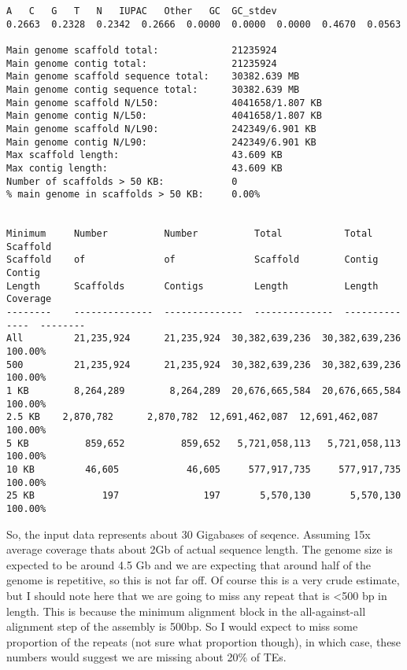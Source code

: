 \documentclass[11pt]{article}
\begin{document}
\begin{verbatim}
A   C   G   T   N   IUPAC   Other   GC  GC_stdev
0.2663  0.2328  0.2342  0.2666  0.0000  0.0000  0.0000  0.4670  0.0563

Main genome scaffold total:             21235924
Main genome contig total:               21235924
Main genome scaffold sequence total:    30382.639 MB
Main genome contig sequence total:      30382.639 MB
Main genome scaffold N/L50:             4041658/1.807 KB
Main genome contig N/L50:               4041658/1.807 KB
Main genome scaffold N/L90:             242349/6.901 KB
Main genome contig N/L90:               242349/6.901 KB
Max scaffold length:                    43.609 KB
Max contig length:                      43.609 KB
Number of scaffolds > 50 KB:            0
% main genome in scaffolds > 50 KB:     0.00%


Minimum     Number          Number          Total           Total           Scaffold
Scaffold    of              of              Scaffold        Contig          Contig  
Length      Scaffolds       Contigs         Length          Length          Coverage
--------    --------------  --------------  --------------  --------------  --------
All         21,235,924      21,235,924  30,382,639,236  30,382,639,236   100.00%
500         21,235,924      21,235,924  30,382,639,236  30,382,639,236   100.00%
1 KB        8,264,289        8,264,289  20,676,665,584  20,676,665,584   100.00%
2.5 KB    2,870,782      2,870,782  12,691,462,087  12,691,462,087   100.00%
5 KB          859,652          859,652   5,721,058,113   5,721,058,113   100.00%
10 KB         46,605            46,605     577,917,735     577,917,735   100.00%
25 KB            197               197       5,570,130       5,570,130   100.00%
\end{verbatim}

    So, the input data represents about 30 Gigabases of seqence. Assuming
15x average coverage thats about 2Gb of actual sequence length. The
genome size is expected to be around 4.5 Gb and we are expecting that
around half of the genome is repetitive, so this is not far off. Of
course this is a very crude estimate, but I should note here that we are
going to miss any repeat that is \textless{}500 bp in length. This is
because the minimum alignment block in the all-against-all alignment
step of the assembly is 500bp. So I would expect to miss some proportion
of the repeats (not sure what proportion though), in which case, these
numbers would suggest we are missing about 20\% of TEs.
\end{document}
